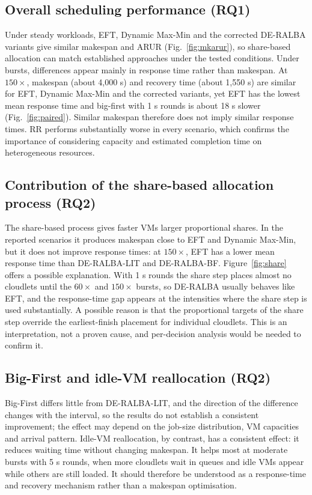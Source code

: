 \documentclass[default,sn-mathphys,Numbered]{sn-jnl}
\begin{document}
\subsection{Overall scheduling performance (RQ1)}
Under steady workloads, EFT, Dynamic Max-Min and the corrected DE-RALBA variants give similar makespan and ARUR (Fig.~\ref{fig:mkarur}), so share-based allocation can match established approaches under the tested conditions. Under bursts, differences appear mainly in response time rather than makespan. At $150\times$, makespan (about 4,000 s) and recovery time (about 1,550 s) are similar for EFT, Dynamic Max-Min and the corrected variants, yet EFT has the lowest mean response time and big-first with 1 s rounds is about 18 s slower (Fig.~\ref{fig:paired}). Similar makespan therefore does not imply similar response times. RR performs substantially worse in every scenario, which confirms the importance of considering capacity and estimated completion time on heterogeneous resources.

\subsection{Contribution of the share-based allocation process (RQ2)}
The share-based process gives faster VMs larger proportional shares. In the reported scenarios it produces makespan close to EFT and Dynamic Max-Min, but it does not improve response times: at $150\times$, EFT has a lower mean response time than DE-RALBA-LIT and DE-RALBA-BF. Figure~\ref{fig:share} offers a possible explanation. With 1 s rounds the share step places almost no cloudlets until the $60\times$ and $150\times$ bursts, so DE-RALBA usually behaves like EFT, and the response-time gap appears at the intensities where the share step is used substantially. A possible reason is that the proportional targets of the share step override the earliest-finish placement for individual cloudlets. This is an interpretation, not a proven cause, and per-decision analysis would be needed to confirm it.

\subsection{Big-First and idle-VM reallocation (RQ2)}
Big-First differs little from DE-RALBA-LIT, and the direction of the difference changes with the interval, so the results do not establish a consistent improvement; the effect may depend on the job-size distribution, VM capacities and arrival pattern. Idle-VM reallocation, by contrast, has a consistent effect: it reduces waiting time without changing makespan. It helps most at moderate bursts with 5 s rounds, when more cloudlets wait in queues and idle VMs appear while others are still loaded. It should therefore be understood as a response-time and recovery mechanism rather than a makespan optimisation.
\end{document}
